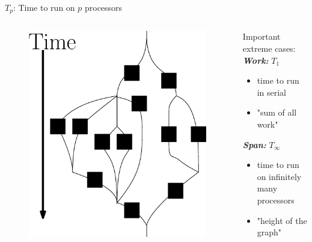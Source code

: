 \documentclass[xcolor=x11names, svgnames, rgb]{beamer}
\newcommand{\defn}[1]       {{\textit{\textbf{\boldmath #1}}}}
\begin{document}
\begin{frame}[t]{\defn{$T_p$}: Time to run on $p$ processors}
	\begin{columns}[T] %
	\begin{column}{.60\textwidth}
		\begin{figure}
			\includegraphics[width=0.8\linewidth]{imgs/parallelForLoop/altParallelForLoopComposition.eps}
		\end{figure}
	\end{column}
	\hfill
	\begin{column}{.45\textwidth}
		Important extreme cases:\\
		\vspace{0.3cm}
		\defn{Work:} $T_1$
		\begin{itemize}
			\item time to run in serial
			\item "sum of all work"
		\end{itemize}
		\vspace{0.3cm}
		\defn{Span:} $T_\infty$
		\begin{itemize}
			\item time to run on infinitely many processors\\ 
			\item "height of the graph"
		\end{itemize}	
	\end{column}
	\end{columns}
\end{frame}
\end{document}
